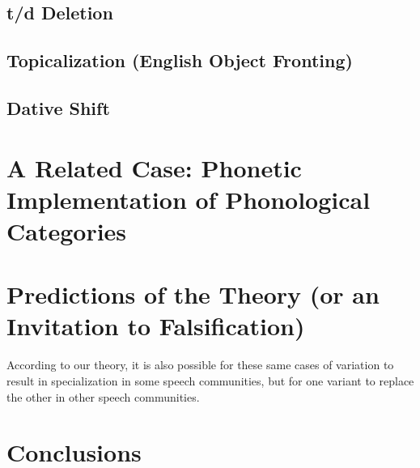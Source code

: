 \subsection{t/d Deletion}

\subsection{Topicalization (English Object Fronting)}
\label{topsect}

\subsection{Dative Shift}

\section{A Related Case: Phonetic Implementation of Phonological Categories}


\section{Predictions of the Theory (or an Invitation to Falsification)}

According to our theory, it is also possible for these same cases of variation to result in specialization in some speech communities, but for one variant to replace the other in other speech communities.

\section{Conclusions}

